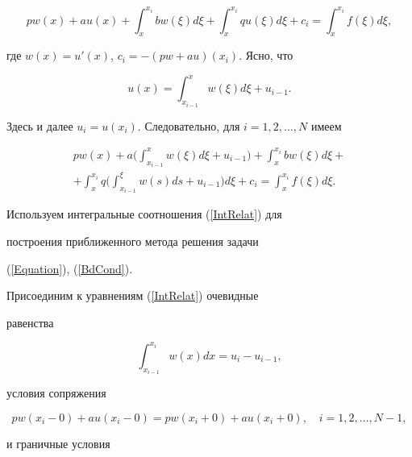 $$


pw(x)+au(x)+\int_x^{x_i } {bw(\xi)d\xi+} \int_x^{x_i } {qu(\xi)d\xi


+ c_i =\int_x^{x_i } {f(\xi)d\xi,} }


$$


где $w(x)=u'(x)$, $c_i=- (pw+au)(x_i)$. Ясно, что


$$


u(x)=\int_{x_{i-1} }^x {w(\xi)d\xi }+u_{i-1}.


$$


Здесь и далее $u_i=u(x_i)$. Следовательно, для $i=1,2,\dotsc,N$ имеем


\begin{multline}


\label{IntRelat}


pw(x)+a\bigg(\int_{x_{i-1} }^x {w(\xi)d\xi }+u_{i-1}\bigg)+\int_x^{x_i }


{bw(\xi)d\xi+}\\


+


\int_x^{x_i } {q\bigg(\int_{x_{i-1} }^\xi {w(s)ds }+u_{i-1}\bigg)d\xi


+c_i =\int_x^{x_i }{f(\xi)d\xi } }.


\end{multline}





Используем интегральные соотношения (\ref{IntRelat}) для


построения приближенного метода решения задачи


(\ref{Equation}), (\ref{BdCond}).


Присоединим к уравнениям (\ref{IntRelat}) очевидные


равенства


\begin{equation} \label{Int_w}


\int_{x_{i-1} }^{x_i } {w(x)dx=u_i-u_{i-1} },


\end{equation}


условия сопряжения


\begin{equation} \label{Cond_Conj}


pw(x_i-0) +au(x_i-0)= pw(x_i+0)+au(x_i+0),\quad i=1,2,\dotsc,N-1,


\end{equation}


и граничные условия


